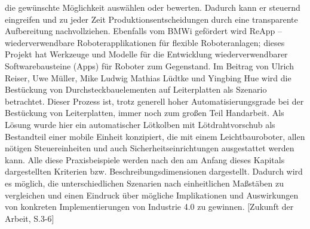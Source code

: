 die gewünschte Möglichkeit auswählen oder bewerten. Dadurch kann er steuernd eingreifen und zu jeder Zeit Produktionsentscheidungen durch eine transparente Aufbereitung
nachvollziehen.
Ebenfalls vom BMWi gefördert wird ReApp – wiederverwendbare Roboterapplikationen für flexible Roboteranlagen; dieses Projekt hat Werkzeuge und Modelle für die Entwicklung wiederverwendbarer Softwarebausteine (Apps) für Roboter zum Gegenstand.
Im Beitrag von Ulrich Reiser, Uwe Müller, Mike Ludwig Mathias Lüdtke und Yingbing
Hue wird die Bestückung von Durchsteckbauelementen auf Leiterplatten als Szenario
betrachtet. Dieser Prozess ist, trotz generell hoher Automatisierungsgrade bei der Bestückung von Leiterplatten, immer noch zum großen Teil Handarbeit. Als Lösung wurde hier
ein automatischer Lötkolben mit Lötdrahtvorschub als Bestandteil einer mobile Einheit
konzipiert, die mit einem Leichtbauroboter, allen nötigen Steuereinheiten und auch
Sicherheitseinrichtungen ausgestattet werden kann.
Alle diese Praxisbeispiele werden nach den am Anfang dieses Kapitals dargestellten
Kriterien bzw. Beschreibungsdimensionen dargestellt. Dadurch wird es möglich, die
unterschiedlichen Szenarien nach einheitlichen Maßstäben zu vergleichen und einen Eindruck über mögliche Implikationen und Auswirkungen von konkreten Implementierungen
von Industrie 4.0 zu gewinnen.
[Zukunft der Arbeit, S.3-6]



